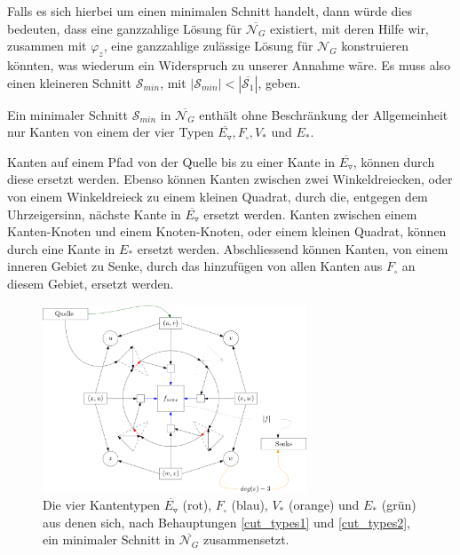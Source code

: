 

Falls es sich hierbei um einen minimalen Schnitt handelt, dann würde dies bedeuten, dass eine ganzzahlige Lösung für $\overline{\mathcal{N}_G}$ existiert, mit deren Hilfe wir, zusammen mit $\varphi_z$, eine ganzzahlige zulässige Lösung für $\mathcal{N}_G$ konstruieren könnten, was wiederum ein Widerspruch zu unserer Annahme wäre. Es muss also einen kleineren Schnitt $\mathcal{S}_{min}$, mit $|\mathcal{S}_{min}| < |\overline{\mathcal{S}_1}|$, geben. 

\begin{claim} \label{cut_types1}

Ein minimaler Schnitt $\mathcal{S}_{min}$ in $\overline{\mathcal{N}_G}$ enthält ohne Beschränkung der Allgemeinheit nur Kanten von einem der vier Typen $\overline{E_\triangledown}, F_\square, V_*$ und $E_*$.

\end{claim}

Kanten auf einem Pfad von der Quelle bis zu einer Kante in $\overline{E_\triangledown}$, können durch diese ersetzt werden. Ebenso können Kanten zwischen zwei Winkeldreiecken, oder von einem Winkeldreieck zu einem kleinen Quadrat, durch die, entgegen dem Uhrzeigersinn, nächste Kante in $\overline{E_\triangledown}$ ersetzt werden. Kanten zwischen einem Kanten-Knoten und einem Knoten-Knoten, oder einem kleinen Quadrat, können durch eine Kante in $E_*$ ersetzt werden. Abschliessend können Kanten, von einem inneren Gebiet zu Senke, durch das hinzufügen von allen Kanten aus $F_\square$ an diesem Gebiet, ersetzt werden.

\begin{figure}[h]
	\centering
  	\includegraphics[width=0.7\textwidth]{face_cut.png}
  	\caption{Die vier Kantentypen $\overline{E_\triangledown}$ (rot), $F_\square$ (blau), $V_*$ (orange) und $E_*$ (grün) aus denen sich, nach Behauptungen \ref{cut_types1} und \ref{cut_types2}, ein minimaler Schnitt in $\overline{\mathcal{N}_G}$ zusammensetzt.}
\end{figure}

